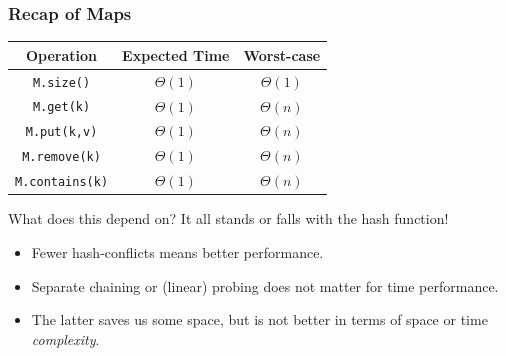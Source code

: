 \begin{frame}
	\frametitle{Recap of Maps}
	
	\begin{center}
		\begin{tabular}{c | c | c}
			Operation & Expected Time & Worst-case \\
			\midrule
			\texttt{M.size()} & $\Theta(1)$& $\Theta(1)$\\
			\texttt{M.get(k)}  & $\Theta(1)$& $\Theta(n)$\\
			\texttt{M.put(k,v)} & $\Theta(1)$& $\Theta(n)$\\
			\texttt{M.remove(k)} & $\Theta(1)$& $\Theta(n)$\\
			\texttt{M.contains(k)} & $\Theta(1)$& $\Theta(n)$\\
		\end{tabular}
	\end{center}
		\begin{block}{What does this depend on?}
			It all stands or falls with the hash function!
			\begin{itemize}
				\item Fewer hash-conflicts means better performance.
				\item Separate chaining or (linear) probing does not matter for time performance.
				\item The latter saves us some space, but is not better in terms of space or time \textit{complexity}.
			\end{itemize}
		\end{block}	
\end{frame}

